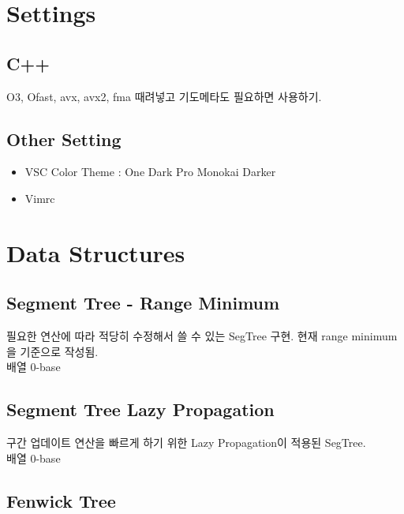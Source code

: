 \documentclass[landscape,8pt]{article}
\begin{document}
\newpage
\maketitle
\begin{multicols}{3}\raggedcolumns
\tableofcontents
\end{multicols}
\pagebreak
\begin{multicols}{2}\raggedcolumns
\section{Settings}
  \subsection{C++}
    O3, Ofast, avx, avx2, fma 때려넣고 기도메타도 필요하면 사용하기.
    
  \subsection{Other Setting}
    \begin{itemize}
      \item VSC Color Theme : One Dark Pro Monokai Darker
      \item Vimrc
      
    \end{itemize}
\section{Data Structures}
  \subsection{Segment Tree - Range Minimum}
     필요한 연산에 따라 적당히 수정해서 쓸 수 있는 SegTree 구현. 현재 range minimum을 기준으로 작성됨.\\
     배열 0-base
     

  \subsection{Segment Tree Lazy Propagation}
     구간 업데이트 연산을 빠르게 하기 위한 Lazy Propagation이 적용된 SegTree.\\
     배열 0-base
     
  \subsection{Fenwick Tree}
    

\end{multicols}
\end{document}
